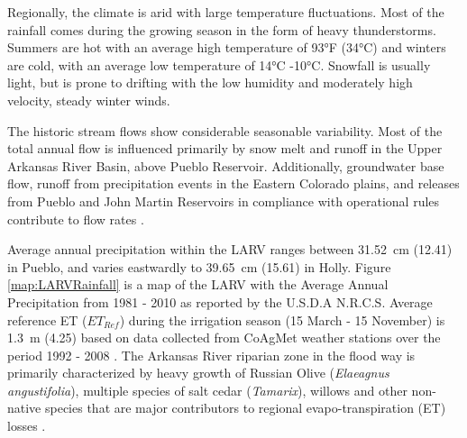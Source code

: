 Regionally, the climate is arid with large temperature fluctuations.  Most of the rainfall comes during the growing season in the form of heavy thunderstorms.  Summers are hot with an average high temperature of \ang{93}F (\ang{34}C) and winters are cold, with an average low temperature of \ang{14}C \ang{-10}C.  Snowfall is usually light, but is prone to drifting with the low humidity and moderately high velocity, steady winter winds.

The historic stream flows show considerable seasonable variability.  Most of the total annual flow is influenced primarily by snow melt and runoff in the Upper Arkansas River Basin, above Pueblo Reservoir.  Additionally, groundwater base flow, runoff from precipitation events in the Eastern Colorado plains, and releases from Pueblo and John Martin Reservoirs in compliance with operational rules contribute to flow rates \parencite{Miller2010}.

Average annual precipitation within the LARV ranges between \SI{31.52}{\centi\meter} (\SI{12.41}{\inch}) in Pueblo, and varies eastwardly to \SI{39.65}{\centi\meter} (\SI{15.61}{\inch}) in Holly.  Figure \ref{map:LARVRainfall} is a map of the LARV with the Average Annual Precipitation from 1981 - 2010 as reported by the U.S.D.A N.R.C.S.  Average reference ET ($ ET_{Ref} $) during the irrigation season (15 March - 15 November) is \SI{1.3}{\meter} (\SI{4.25}{\foot}) based on data collected from CoAgMet weather stations over the period 1992 - 2008 \parencite{clifford2009}.  The Arkansas River riparian zone in the flood way is primarily characterized by heavy growth of Russian Olive (\textit{Elaeagnus angustifolia}), multiple species of salt cedar (\textit{Tamarix}), willows and other non-native species that are major contributors to regional evapo-transpiration (ET) losses \parencite{Nagler2010a}.


